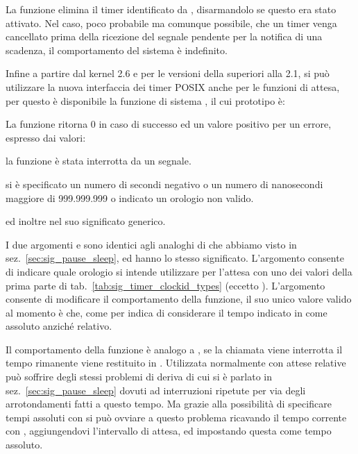 La funzione elimina il timer identificato da , disarmandolo se
questo era stato attivato. Nel caso, poco probabile ma comunque possibile, che
un timer venga cancellato prima della ricezione del segnale pendente per la
notifica di una scadenza, il comportamento del sistema è indefinito.

Infine a partire dal kernel 2.6 e per le versioni della  superiori
alla 2.1, si può utilizzare la nuova interfaccia dei timer POSIX anche per le
funzioni di attesa, per questo è disponibile la funzione di sistema
, il cui prototipo è:

\begin{funcproto}{
}

{La funzione ritorna $0$ in caso di successo ed un valore positivo per un
  errore, espresso dai valori:
  \begin{errlist}
    \item[\errcode{EINTR}] la funzione è stata interrotta da un segnale.
    \item[\errcode{EINVAL}] si è specificato un numero di secondi negativo o
      un numero di nanosecondi maggiore di 999.999.999 o indicato un orologio
      non valido.
  \end{errlist}
  ed inoltre  nel suo significato generico.}
\end{funcproto}

I due argomenti  e  sono identici agli analoghi di
 che abbiamo visto in sez.~\ref{sec:sig_pause_sleep}, ed hanno
lo stesso significato.  L'argomento  consente di indicare
quale orologio si intende utilizzare per l'attesa con uno dei valori della
prima parte di tab.~\ref{tab:sig_timer_clockid_types} (eccetto
).  L'argomento  consente di
modificare il comportamento della funzione, il suo unico valore valido al
momento è  che, come per  indica di
considerare il tempo indicato in  come assoluto anziché
relativo.

Il comportamento della funzione è analogo a , se la chiamata
viene interrotta il tempo rimanente viene restituito in .
Utilizzata normalmente con attese relative può soffrire degli stessi problemi
di deriva di cui si è parlato in sez.~\ref{sec:sig_pause_sleep} dovuti ad
interruzioni ripetute per via degli arrotondamenti fatti a questo tempo.  Ma
grazie alla possibilità di specificare tempi assoluti con  si può
ovviare a questo problema ricavando il tempo corrente con
, aggiungendovi l'intervallo di attesa, ed impostando
questa come tempo assoluto.

